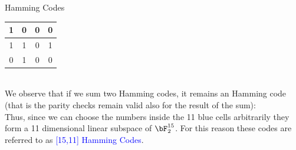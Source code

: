 \begin{frame}{Hamming Codes}
\begin{minipage}{0.25\textwidth}
\begin{tabular}{|c|c|c|c|}
            \cellcolor{red!20} 1 & \cellcolor{blue!20} 0 & \cellcolor{blue!20}  0 & \cellcolor{blue!20} 0  \\ \hline
            \cellcolor{red!20} 1 & \cellcolor{blue!20} 1 &\cellcolor{blue!20}  0 &\cellcolor{blue!20} 1  \\ \hline
             \rowcolor{blue!20}0 & 1 & 0 & 0  \\ \hline
        \end{tabular}
    \end{minipage} \\
\bigskip \pause
We observe that if we sum two Hamming codes, it remains an Hamming code (that is the parity checks remain valid also for the result of the sum): \\
\pause
     Thus, since we can choose the numbers inside the 11 blue cells arbitrarily they form a 11 dimensional linear subspace of $\bF_2^{15}$.  For this reason these codes are referred to as \textcolor{blue}{[15,11] Hamming Codes}.
     
\end{frame}

